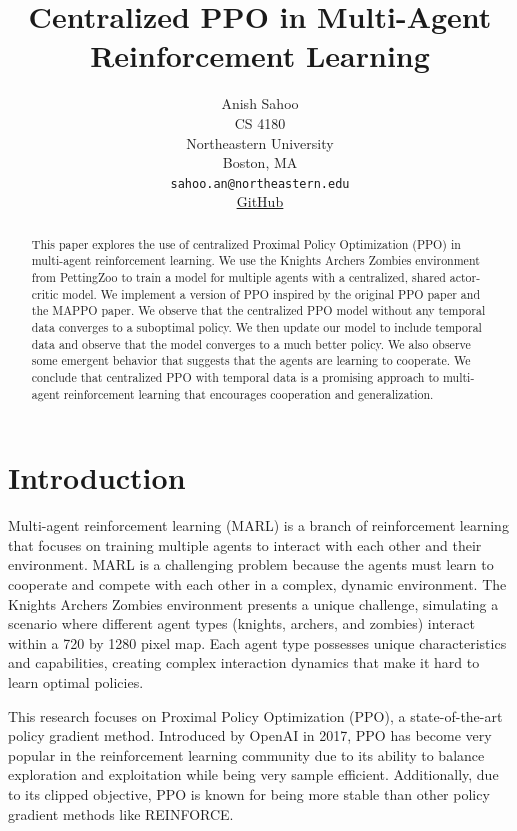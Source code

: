 \documentclass{article}
\title{Centralized PPO in Multi-Agent Reinforcement Learning
}
\author{
  Anish Sahoo \\
  CS 4180 \\
  Northeastern University \\
  Boston, MA\\
  \texttt{sahoo.an@northeastern.edu} \\
  \href{https://github.com/anish-sahoo/KnightsArchersZombiesPPO}{\underline{GitHub}} \\
}
\begin{document}
\maketitle


\begin{abstract}
This paper explores the use of centralized Proximal Policy Optimization (PPO) in multi-agent 
reinforcement learning. We use the Knights Archers Zombies environment from PettingZoo to train 
a model for multiple agents with a centralized, shared actor-critic model. We implement a version of PPO inspired
by the original PPO paper and the MAPPO paper. We observe that the centralized PPO model without
any temporal data converges to a suboptimal policy. We then update our model to include temporal data
and observe that the model converges to a much better policy. We also observe some emergent behavior
that suggests that the agents are learning to cooperate. We conclude that centralized PPO with temporal
data is a promising approach to multi-agent reinforcement learning that encourages cooperation 
and generalization.

\end{abstract}




\section{Introduction}
Multi-agent reinforcement learning (MARL) is a branch of reinforcement learning that focuses on
training multiple agents to interact with each other and their environment. MARL is a challenging
problem because the agents must learn to cooperate and compete with each other in a complex,
dynamic environment. The Knights Archers Zombies environment presents a unique challenge, simulating 
a scenario where different agent types (knights, archers, and zombies) interact 
within a 720 by 1280 pixel map. Each agent type possesses unique characteristics 
and capabilities, creating complex interaction dynamics that make it hard to learn optimal policies.

This research focuses on Proximal Policy Optimization (PPO), a 
state-of-the-art policy gradient method. Introduced by OpenAI \cite{DBLP:journals/corr/SchulmanWDRK17} in 2017, 
PPO has become very popular in the reinforcement learning community 
due to its ability to balance exploration and 
exploitation while being very sample efficient. Additionally, due to its clipped objective,
PPO is known for being more stable than other policy gradient methods like REINFORCE.
\end{document}
